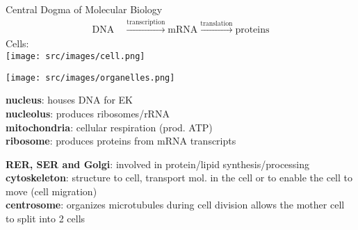 Central Dogma of Molecular Biology
\[
\boxed{
    \begin{aligned}
        \text{DNA} \ &\xrightarrow{\text{transcription}} \text{mRNA} \xrightarrow{\text{translation}} \text{proteins}
    \end{aligned}
}
\]
Cells:\\
\texttt{[image: src/images/cell.png]}

\begin{minipage}{0.45\linewidth}
    \texttt{[image: src/images/organelles.png]}
\end{minipage}
\begin{minipage}{0.55\linewidth}
    \textbf{nucleus}: houses DNA for EK\\
    \textbf{nucleolus}: produces ribosomes/rRNA\\
    \textbf{mitochondria}: cellular respiration (prod. ATP)\\
    \textbf{ribosome}: produces proteins from mRNA transcripts\\
    
\end{minipage}
\vspace{1mm}
\textbf{RER, SER and Golgi}: involved in protein/lipid synthesis/processing\\
\textbf{cytoskeleton}: structure to cell, transport mol. in the cell or to enable the cell to move (cell migration)\\
\textbf{centrosome}: organizes microtubules during cell division allows the mother cell to split into 2 cells\\
